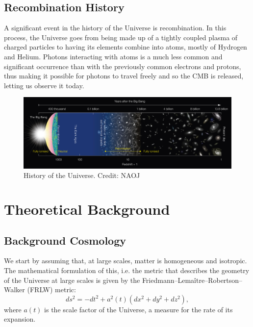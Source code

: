 \documentclass{aa}
\begin{document}
\subsection{Recombination History}

A significant event in the history of the Universe is recombination. In this process, the Universe goes from being made up of a tightly coupled plasma of charged particles to having its elements combine into atoms, mostly of Hydrogen and Helium. Photons interacting with atoms is a much less common and significant occurrence than with the previously common electrons and protons, thus making it possible for photons to travel freely and so the CMB is released, letting us observe it today.

\begin{figure}[ht]
\caption{History of the Universe. Credit: NAOJ}             
\label{fig:history}      
\centering          
\includegraphics[width=\textwidth]{report/figures/eso1620a.jpg}
\end{figure}

\section{Theoretical Background}

\subsection{Background Cosmology}

We start by assuming that, at large scales, matter is homogeneous and isotropic. The mathematical formulation of this, i.e. the metric that describes the geometry of the Universe at large scales is given by the Friedmann–Lemaître–Robertson–Walker (FRLW) metric:
\begin{equation}
ds^2 = -dt^2 + a^2(t)(dx^2 + dy^2 + dz^2),
\end{equation}
where $a(t)$ is the scale factor of the Universe, a measure for the rate of its expansion.
\end{document}
